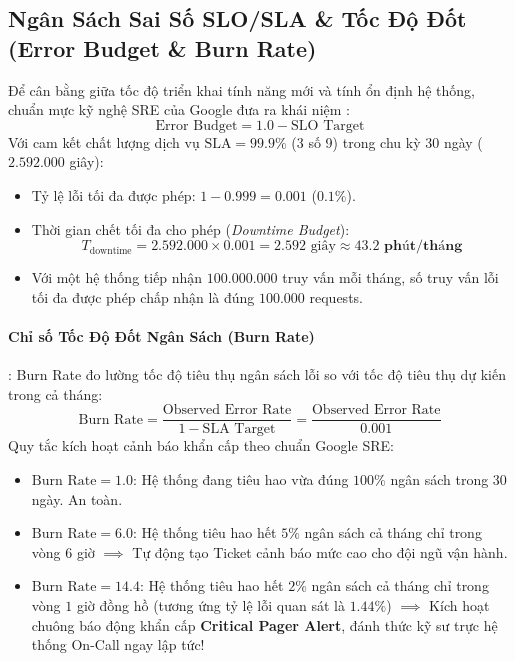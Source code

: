 \subsection{Ngân Sách Sai Số SLO/SLA \& Tốc Độ Đốt (Error Budget \& Burn Rate)}
Để cân bằng giữa tốc độ triển khai tính năng mới và tính ổn định hệ thống, chuẩn mực kỹ nghệ SRE của Google đưa ra khái niệm :
\begin{equation}
\text{Error Budget} = 1.0 - \text{SLO Target}
\end{equation}
Với cam kết chất lượng dịch vụ $\text{SLA} = 99.9\%$ ($3$ số 9) trong chu kỳ 30 ngày ($2.592.000$ giây):
\begin{itemize}
  \item Tỷ lệ lỗi tối đa được phép: $1 - 0.999 = 0.001$ ($0.1\%$).
  \item Thời gian chết tối đa cho phép (\textit{Downtime Budget}):
  \begin{equation}
  T_{\text{downtime}} = 2.592.000 \times 0.001 = 2.592 \text{ giây} \approx \mathbf{43.2 \text{ phút/tháng}}
  \end{equation}
  \item Với một hệ thống tiếp nhận $100.000.000$ truy vấn mỗi tháng, số truy vấn lỗi tối đa được phép chấp nhận là đúng $100.000$ requests.
\end{itemize}

\paragraph{Chỉ số Tốc Độ Đốt Ngân Sách (Burn Rate)}:
Burn Rate đo lường tốc độ tiêu thụ ngân sách lỗi so với tốc độ tiêu thụ dự kiến trong cả tháng:
\begin{equation}
\text{Burn Rate} = \frac{\text{Observed Error Rate}}{1 - \text{SLA Target}} = \frac{\text{Observed Error Rate}}{0.001}
\label{eq:burn-rate-formula}
\end{equation}
Quy tắc kích hoạt cảnh báo khẩn cấp theo chuẩn Google SRE:
\begin{itemize}
  \item $\text{Burn Rate} = 1.0$: Hệ thống đang tiêu hao vừa đúng $100\%$ ngân sách trong 30 ngày. An toàn.
  \item $\text{Burn Rate} = 6.0$: Hệ thống tiêu hao hết $5\%$ ngân sách cả tháng chỉ trong vòng $6$ giờ $\implies$ Tự động tạo Ticket cảnh báo mức cao cho đội ngũ vận hành.
  \item $\text{Burn Rate} = 14.4$: Hệ thống tiêu hao hết $2\%$ ngân sách cả tháng chỉ trong vòng $1$ giờ đồng hồ (tương ứng tỷ lệ lỗi quan sát là $1.44\%$) $\implies$ Kích hoạt chuông báo động khẩn cấp \textbf{Critical Pager Alert}, đánh thức kỹ sư trực hệ thống On-Call ngay lập tức!
\end{itemize}

